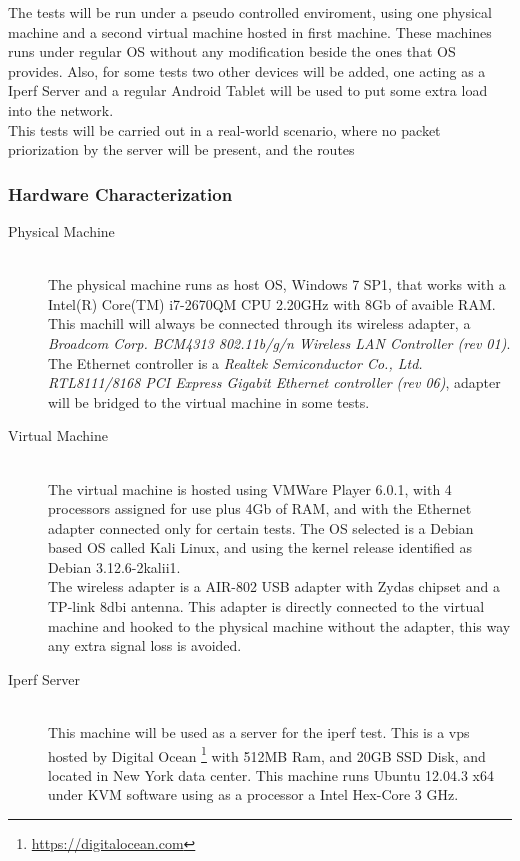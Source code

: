 The tests will be run under a pseudo controlled enviroment, using one physical 
machine and a second virtual machine hosted in first machine. These machines 
runs under regular OS without any modification beside the ones that OS provides.
Also, for some tests two other devices will be added, one acting as a Iperf 
Server and a regular Android Tablet will be used to put some extra load into the
network.\\

This tests will be carried out in a real-world scenario, where no packet 
priorization by the server will be present, and the routes 


\subsubsection{Hardware Characterization}

\begin{description}

\item [Physical Machine] \hfill \\
The physical machine runs as host OS, Windows 7 SP1, that works with a Intel(R)
Core(TM) i7-2670QM CPU \@ 2.20GHz with 8Gb of avaible RAM. This machill will 
always be connected through its wireless adapter, a \textit{Broadcom Corp. 
BCM4313 802.11b/g/n Wireless LAN Controller (rev 01)}. The Ethernet controller 
is a \textit{Realtek Semiconductor Co., Ltd. RTL8111/8168 PCI Express Gigabit 
Ethernet controller (rev 06)}, adapter will be bridged to the virtual 
machine in some tests.\\

\item[Virtual Machine] \hfill \\
The virtual machine is hosted using VMWare Player 6.0.1, with 4 processors 
assigned for use plus 4Gb of RAM, and with the Ethernet adapter connected only
for certain tests. The OS selected is a Debian based OS called Kali Linux, and
using the kernel release identified as Debian 3.12.6-2kalii1.\\

The wireless adapter is a AIR-802 USB adapter with Zydas chipset and a TP-link 
8dbi antenna. This adapter is directly connected to the virtual machine and 
hooked to the physical machine without the adapter, this way any extra signal 
loss is avoided. \\

\item[Iperf Server] \hfill \\
This machine will be used as a server for the iperf test. This is a vps hosted 
by Digital Ocean \footnote{\url{https://digitalocean.com}} with 512MB Ram, and 
20GB SSD Disk, and located in New York data center. This machine runs Ubuntu 
12.04.3 x64 under KVM software using as a processor a Intel Hex-Core 3 GHz.

\end{description}
